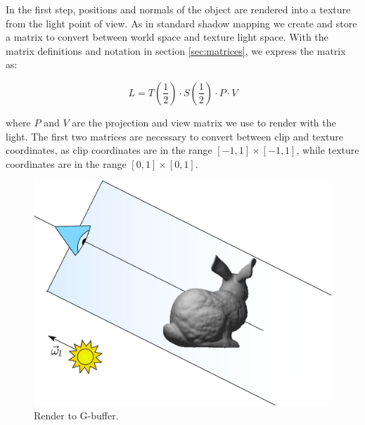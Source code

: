 In the first step, positions and normals of the object are rendered into a texture from the light point of view. As in standard shadow mapping we create and store a matrix to convert between world space and texture light space. With the matrix definitions and notation in section \ref{sec:matrices}, we express the matrix as:

$$
L = T\left(\frac{1}{2}\right) \cdot S\left(\frac{1}{2}\right) \cdot P \cdot V
$$

where $P$ and $V$ are the projection and view matrix we use to render with the light. The first two matrices are necessary to convert between clip and texture coordinates, as clip coordinates are in the range $[-1,1] \times [-1,1]$, while texture coordinates are in the range $[0,1]\times[0,1]$. 

\begin{figure}[!ht]
\centering
\includegraphics[width=0.5 \linewidth]{images/method/step1}
\caption{Render to G-buffer.}
\label{fig:step1}
\end{figure} 


